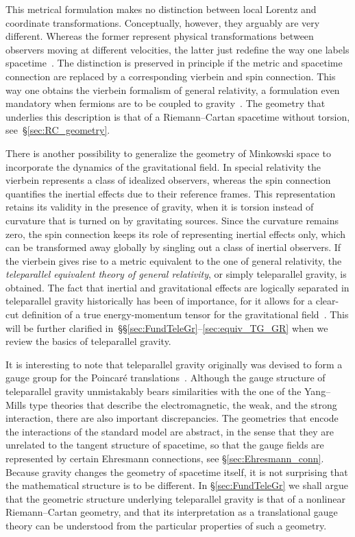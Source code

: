 \documentclass[
final,
11pt,
a4paper,
DIV=11,
headinclude=true,
footinclude=false,
bibliography=totoc,
twoside=true,  %
BCOR=5mm
]{scrbook}
\begin{document}
This metrical formulation makes no distinction between local 
Lorentz and coordinate transformations.  Conceptually, however, 
they arguably are very different. Whereas the former represent 
physical transformations between observers moving at different 
velocities, the latter just redefine the way one labels 
spacetime~\cite{Edelstein:2006a}. The distinction is preserved in 
principle if the metric and spacetime connection are replaced by 
a corresponding vierbein and spin connection. This way one 
obtains the vierbein formalism of general relativity, 
a formulation even mandatory when fermions are to be coupled to 
gravity~\cite{Dirac:1958er, Brill:1957fx}.  The geometry that 
underlies this description is that of a Riemann--Cartan spacetime 
without torsion, see~\S\ref{sec:RC_geometry}.

There is another possibility to generalize the geometry of 
Minkowski space to incorporate the dynamics of the gravitational 
field. In special relativity the vierbein represents a class of 
idealized observers, whereas the spin connection quantifies the 
inertial effects due to their reference frames. This 
representation retains its validity in the presence of gravity, 
when it is torsion instead of curvature that is turned on by 
gravitating sources. Since the curvature remains zero, the spin 
connection keeps its role of representing inertial effects only, 
which can be transformed away globally by singling out a class of 
inertial observers. If the vierbein gives rise to a metric 
equivalent to the one of general relativity, the 
\emph{teleparallel equivalent theory of general relativity}, or 
simply teleparallel gravity, is obtained. The fact that inertial 
and gravitational effects are logically separated in teleparallel 
gravity historically has been of importance, for it allows for 
a clear-cut definition of a true energy-momentum tensor for the 
gravitational field~\cite{Moller:1961ap, deAndrade:2000kr}. This 
will be further clarified 
in~\S\S\ref{sec:FundTeleGr}--\ref{sec:equiv_TG_GR} when we review 
the basics of teleparallel gravity.

It is interesting to note that teleparallel gravity originally 
was devised to form a gauge group for the Poincar\'e 
translations~\cite{Hayashi:1967se,Cho:1975dh}. Although the gauge 
structure of teleparallel gravity unmistakably bears similarities 
with the one of the Yang--Mills type theories that describe the 
electromagnetic, the weak, and the strong interaction, there are 
also important discrepancies. The geometries that encode the 
interactions of the standard model are abstract, in the sense 
that they are unrelated to the tangent structure of spacetime, so 
that the gauge fields are represented by certain Ehresmann 
connections, see \S\ref{sec:Ehresmann_conn}. Because gravity 
changes the geometry of spacetime itself, it is not surprising 
that the mathematical structure is to be different. In 
\S\ref{sec:FundTeleGr} we shall argue that the geometric 
structure underlying teleparallel gravity is that of a nonlinear 
Riemann--Cartan geometry, and that its interpretation as
a translational gauge theory can be understood from the 
particular properties of such a geometry.
\end{document}
